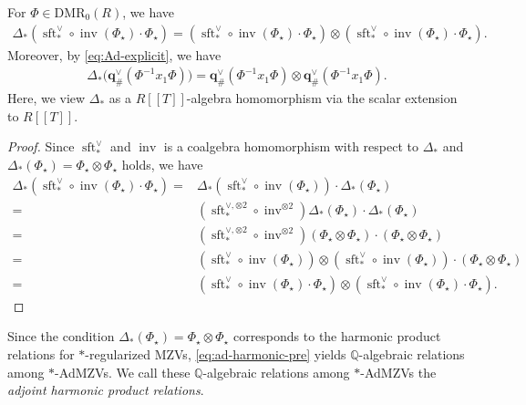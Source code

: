 \documentclass[15pt,oneside,reqno]{amsart}
\theoremstyle{remark}{
\newtheorem{lem}[df]{Lemma}
\newtheorem{prop}[df]{Proposition}
\newtheorem{ex}[df]{Example}
\newtheorem{rmk}[df]{Remark}
}
\newcommand{\Q}{\mathbb{Q}}
\newcommand{\DMR}{\mathrm{DMR}}
\DeclareMathOperator{\inv}{inv}
\DeclareMathOperator{\sft}{sft}
\begin{document}
\begin{prop}[ = Proposition \ref{prop:t-adic} (\ref{thm:t-adic-2})]\label{prop:Ad-har}
For $\Phi \in \DMR_0(R)$,
we have
\begin{align}
\Delta_*(\sft_{*}^{\vee} \circ \inv(\Phi_{\star}) \cdot \Phi_{\star}) = (\sft_{*}^{\vee} \circ \inv(\Phi_{\star}) \cdot \Phi_{\star}) \otimes (\sft_{*}^{\vee} \circ \inv(\Phi_{\star}) \cdot \Phi_{\star}). \label{eq:ad-harmonic-pre}
\end{align}
Moreover, by \eqref{eq:Ad-explicit}, we have
\begin{align}
\Delta_*\bigl(\mathbf{q}_{\#}^{\vee}(\Phi^{-1} x_1 \Phi)\bigr)
= \mathbf{q}_{\#}^{\vee}(\Phi^{-1} x_1 \Phi)\otimes
\mathbf{q}_{\#}^{\vee}(\Phi^{-1} x_1 \Phi).
\label{eq:ad-harmonic}
\end{align}
Here, we view $\Delta_*$ as a $R[[T]]$-algebra homomorphism via the scalar extension to $R[[T]]$.
\end{prop}



\begin{proof}
Since $\sft_*^{\vee}$ and $\inv$ is a coalgebra homomorphism with respect to $\Delta_*$ and $\Delta_*(\Phi_{\star}) = \Phi_{\star} \otimes \Phi_{\star}$ holds, we have
\begin{align*}
\Delta_*(\sft_*^{\vee}\circ \inv(\Phi_{\star}) \cdot \Phi_{\star}) =& \Delta_*( \sft_*^{\vee} \circ \inv(\Phi_{\star})) \cdot \Delta_*(\Phi_{\star}) \\
=&(\sft_*^{\vee,\otimes 2} \circ \inv^{\otimes 2} ) \Delta_*(\Phi_{\star}) \cdot \Delta_*(\Phi_{\star}) \\
=&( \sft_*^{\vee,\otimes 2} \circ  \inv^{\otimes 2} ) (\Phi_{\star} \otimes \Phi_{\star}) \cdot (\Phi_{\star} \otimes \Phi_{\star})\\
=& (\sft_*^{\vee}\circ \inv(\Phi_{\star})) \otimes (\sft_*^{\vee}\circ \inv(\Phi_{\star})) \cdot  (\Phi_{\star} \otimes \Phi_{\star}) \\
=& (\sft_*^{\vee}\circ \inv(\Phi_{\star}) \cdot \Phi_{\star}) \otimes (\sft_*^{\vee}\circ \inv(\Phi_{\star}) \cdot \Phi_{\star}).
\end{align*}
\end{proof}


Since the condition $\Delta_{*}(\Phi_{\star})=\Phi_{\star}\otimes \Phi_{\star}$ corresponds to the harmonic product relations for $*$-regularized MZVs, \eqref{eq:ad-harmonic-pre} yields $\Q$-algebraic relations among $*$-AdMZVs.
We call these $\Q$-algebraic relations among $*$-AdMZVs the \emph{adjoint harmonic product relations}.
\end{document}
